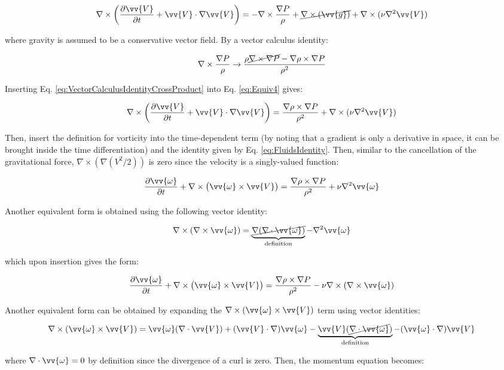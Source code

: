 \documentclass[10pt]{article}
\newcommand{\beq}{\begin{equation}}
\newcommand{\eeq}{\end{equation}}
\begin{document}
\begin{flushleft}
\beq
\label{eq:Equiv4}
\nabla\times\left(\frac{\partial \vv{V}}{\partial t}+\vv{V}\cdot\nabla\vv{V}\right)=-\nabla\times\frac{\nabla P}{\rho}+\cancel{\nabla\times(\vv{g})}+\nabla\times(\nu\nabla^2\vv{V})
\eeq

where gravity is assumed to be a conservative vector field. By a vector calculus identity:

\beq
\label{eq:VectorCalculusIdentityCrossProduct}
\nabla\times\frac{\nabla P}{\rho}\rightarrow\frac{\rho\cancel{\nabla\times\nabla P}-\nabla\rho\times\nabla P}{\rho^2}
\eeq

Inserting Eq. \eqref{eq:VectorCalculusIdentityCrossProduct} into Eq. \eqref{eq:Equiv4} gives:

\beq
\nabla\times\left(\frac{\partial \vv{V}}{\partial t}+\vv{V}\cdot\nabla\vv{V}\right)=\frac{\nabla\rho\times\nabla P}{\rho^2}+\nabla\times(\nu\nabla^2\vv{V})
\eeq

Then, insert the definition for vorticity into the time-dependent term (by noting that a gradient is only a derivative in space, it can be brought inside the time differentiation) and the identity given by Eq. \eqref{eq:FluidsIdentity}. Then, similar to the cancellation of the gravitational force, \(\nabla\times(\nabla(V^2/2))\) is zero since the velocity is a singly-valued function:

\beq
\frac{\partial \vv{\omega}}{\partial t}+\nabla\times\left(\vv{\omega}\times\vv{V}\right)=\frac{\nabla\rho\times\nabla P}{\rho^2}+\nu\nabla^2\vv{\omega}
\eeq

Another equivalent form is obtained using the following vector identity:

\beq
\nabla\times(\nabla\times\vv{\omega})=\underbrace{\cancel{\nabla(\nabla\cdot\vv{\omega})}}_{\text{definition}}-\nabla^2\vv{\omega}
\eeq

which upon insertion gives the form:

\beq
\frac{\partial \vv{\omega}}{\partial t}+\nabla\times\left(\vv{\omega}\times\vv{V}\right)=\frac{\nabla\rho\times\nabla P}{\rho^2}-\nu\nabla\times(\nabla\times\vv{\omega})
\eeq

Another equivalent form can be obtained by expanding the \(\nabla\times(\vv{\omega}\times\vv{V})\) term using vector identities:

\beq
\nabla\times(\vv{\omega}\times\vv{V})=\vv{\omega}(\nabla\cdot\vv{V})+(\vv{V}\cdot\nabla)\vv{\omega}-\underbrace{\vv{V}(\cancel{\nabla\cdot\vv{\omega}})}_{\text{definition}}-(\vv{\omega}\cdot\nabla)\vv{V}
\eeq

where \(\nabla\cdot\vv{\omega}=0\) by definition since the divergence of a curl is zero. Then, the momentum equation becomes:


\end{flushleft}
\end{document}
